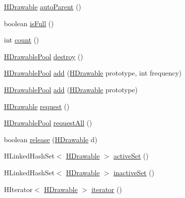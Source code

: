 \begin{DoxyCompactItemize}
\hyperlink{classhype_1_1drawable_1_1_h_drawable}{H\-Drawable} \hyperlink{classhype_1_1util_1_1_h_drawable_pool_aeac74d4b43d88ff02763e5d1dfbdf440}{auto\-Parent} ()
\item 
boolean \hyperlink{classhype_1_1util_1_1_h_drawable_pool_a70720621ce4b65a4f40305e4f80ff398}{is\-Full} ()
\item 
int \hyperlink{classhype_1_1util_1_1_h_drawable_pool_a9b54aed98225477498edc3e923705932}{count} ()
\item 
\hyperlink{classhype_1_1util_1_1_h_drawable_pool}{H\-Drawable\-Pool} \hyperlink{classhype_1_1util_1_1_h_drawable_pool_ad04926d581f304a3592ad3c63e30847e}{destroy} ()
\item 
\hyperlink{classhype_1_1util_1_1_h_drawable_pool}{H\-Drawable\-Pool} \hyperlink{classhype_1_1util_1_1_h_drawable_pool_a767b65b151c3a86665f04f365d3077a4}{add} (\hyperlink{classhype_1_1drawable_1_1_h_drawable}{H\-Drawable} prototype, int frequency)
\item 
\hyperlink{classhype_1_1util_1_1_h_drawable_pool}{H\-Drawable\-Pool} \hyperlink{classhype_1_1util_1_1_h_drawable_pool_a30f1848a14b1a85870d6765884e007af}{add} (\hyperlink{classhype_1_1drawable_1_1_h_drawable}{H\-Drawable} prototype)
\item 
\hyperlink{classhype_1_1drawable_1_1_h_drawable}{H\-Drawable} \hyperlink{classhype_1_1util_1_1_h_drawable_pool_a5d67b9c6cd38a3b2d3a4b001f3d03e92}{request} ()
\item 
\hyperlink{classhype_1_1util_1_1_h_drawable_pool}{H\-Drawable\-Pool} \hyperlink{classhype_1_1util_1_1_h_drawable_pool_a2ec580c20cc33c9510183aec65e454bb}{request\-All} ()
\item 
boolean \hyperlink{classhype_1_1util_1_1_h_drawable_pool_a87405a81b72caacd0b94280ebbe60143}{release} (\hyperlink{classhype_1_1drawable_1_1_h_drawable}{H\-Drawable} d)
\item 
H\-Linked\-Hash\-Set$<$ \hyperlink{classhype_1_1drawable_1_1_h_drawable}{H\-Drawable} $>$ \hyperlink{classhype_1_1util_1_1_h_drawable_pool_a8326e4bd816cc062c2ed3f0535b78026}{active\-Set} ()
\item 
H\-Linked\-Hash\-Set$<$ \hyperlink{classhype_1_1drawable_1_1_h_drawable}{H\-Drawable} $>$ \hyperlink{classhype_1_1util_1_1_h_drawable_pool_a3b6820ee8be2d8416d252f701f41eb3b}{inactive\-Set} ()
\item 
H\-Iterator$<$ \hyperlink{classhype_1_1drawable_1_1_h_drawable}{H\-Drawable} $>$ \hyperlink{classhype_1_1util_1_1_h_drawable_pool_aa3327f969773d3a77239a955e2ae1274}{iterator} ()
\end{DoxyCompactItemize}
